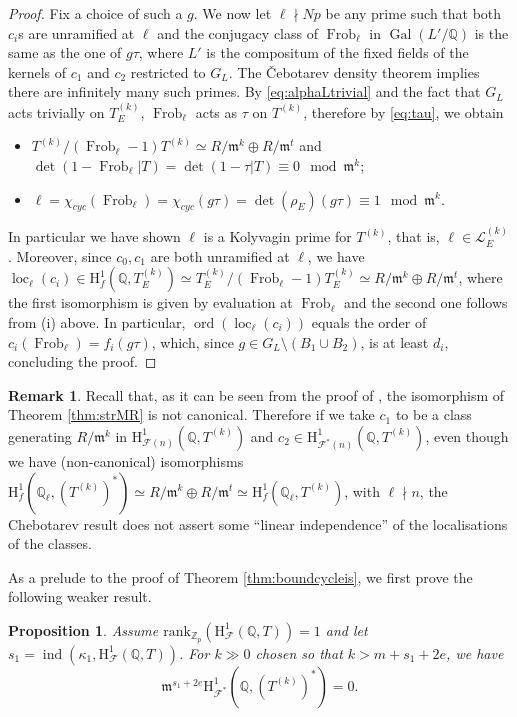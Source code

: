 \documentclass[10pt,reqno]{amsart}
\numberwithin{equation}{section}
\theoremstyle{plain}
\theoremstyle{definition}
\newtheorem{rmk}[thm]{Remark}
\theoremstyle{definition}
\theoremstyle{plain}
\newtheorem{prop}[thm]{Proposition}
\theoremstyle{plain}
\theoremstyle{plain}
\theoremstyle{plain}
\theoremstyle{plain}
\theoremstyle{plain}
\DeclareMathOperator{\ord}{ord}
\newcommand{\ind}{\operatorname{ind}}
\newcommand{\Gal}{\operatorname{Gal}}
\newcommand{\Z}{\mathbb{Z}}
\newcommand{\Q}{\mathbb{Q}}
\DeclareMathOperator{\frob}{Frob}
\DeclareMathOperator{\loc}{loc}
\newcommand{\Fcal}{\mathcal{F}}
\newcommand{\cL}{\mathcal{L}}
\newcommand{\rank}{\mathrm{rank}}
\newcommand{\fm}{\mathfrak{m}}
\newcommand{\rH}{\mathrm{H}}
\begin{document}
\begin{proof}
Fix a choice of such a $g$. We now let $\ell\nmid Np$ be any prime such that both $c_i$s are unramified at $\ell$ and the conjugacy class of $\frob_\ell$ in
$\Gal(L'/\Q)$ is the same as the one of $g\tau$, where $L'$ is the compositum of the fixed fields of the kernels of $c_1$ and $c_2$ restricted to $G_L$.  The \v{C}ebotarev density theorem implies there are infinitely many such primes. By \eqref{eq:alphaLtrivial} and  the fact that $G_L$ acts trivially on $T_E^{(k)}$, $\frob_\ell$ acts as $\tau$ on $T^{(k)}$, therefore by \eqref{eq:tau}, we obtain
\begin{itemize}
\item[(i)] $T^{(k)}/(\frob_{\ell}-1)T^{(k)}\simeq R/\fm^k\oplus R/\fm^t$ and $\det(1-\frob_\ell|T)=\det(1-\tau|T)\equiv 0\mod\fm^k$;
\item[(ii)] $\ell=\chi_{cyc}(\frob_\ell)=\chi_{cyc}(g\tau)=\det(\rho_E)(g\tau) \equiv 1 \mod \fm^k$.
\end{itemize}
In particular we have shown $\ell$ is a Kolyvagin prime for $T^{(k)}$, that is, $\ell\in \cL_E^{(k)}$. 
Moreover, since $c_0,c_1$ are both unramified at $\ell$, we have $\loc_\ell(c_i)\in \rH^1_f(\Q,T_E^{(k)})\simeq T_E^{(k)}/(\frob_\ell -1)T_E^{(k)}\simeq R/\fm^k\oplus R/\fm^t$, where the first isomorphism is given by evaluation at $\frob_\ell$ and the second one follows from (i) above. In particular, $\ord(\loc_\ell(c_i))$ equals the order of $c_i(\frob_\ell)=f_i(g\tau)$, which, since $g \in G_L\setminus (B_1\cup B_2)$, is at least $d_i$, concluding the proof.
\end{proof}
\begin{rmk}
Recall that, as it can be seen from the proof of \cite[Thm.~4.1.13]{mazrub}, the isomorphism of Theorem \ref{thm:strMR} is not canonical. Therefore if we take $c_1$ to be a class generating $R/\fm^k$ in $\rH^1_{\Fcal(n)}(\Q, T^{(k)})$ and $c_2\in \rH^1_{\Fcal^*(n)}(\Q, T^{(k)})$, even though we have (non-canonical) isomorphisms $\rH^1_f(\Q_\ell, (T^{(k)})^*)\simeq R/\fm^k\oplus R/\fm^t\simeq \rH^1_f(\Q_\ell, T^{(k)})$, with $\ell\nmid n$, the Chebotarev result does not assert some ``linear independence'' of the localisations of the classes.
\end{rmk}
As a prelude to the proof of Theorem \ref{thm:boundcycleis}, we first prove the following weaker result. 
\begin{prop}\label{prop:expbound}
Assume $\rank_{\Z_p}(\rH^1_{\Fcal}(\Q,T))=1$ and let $s_1=\ind(\kappa_1, \rH^1_{\Fcal}(\Q,T))$. For $k\gg 0$ chosen so that $k > m+s_1+2e$, we have $$\fm^{s_1+2e}\rH^1_{\Fcal^*}(\Q,(T^{(k)})^*)=0.$$
\end{prop}
\end{document}
